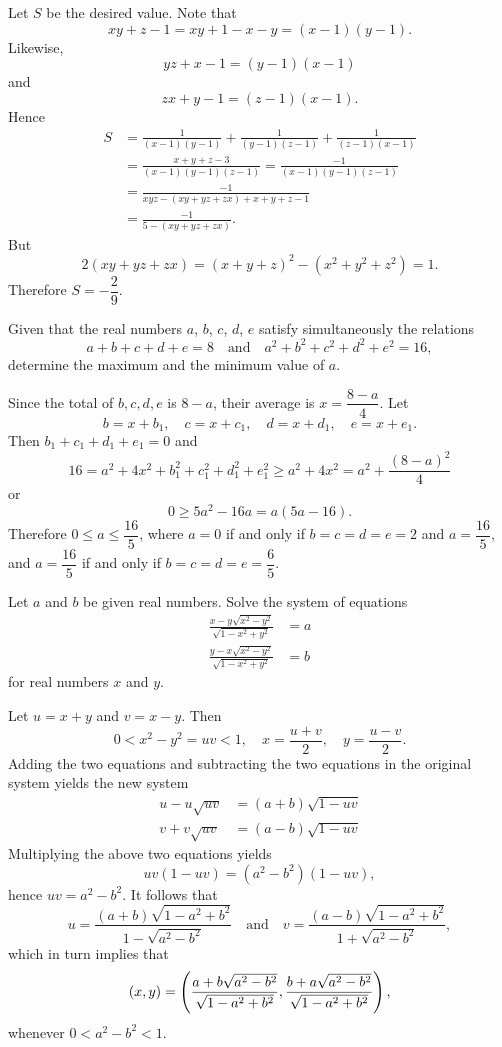 \begin{solution}
Let $S$ be the desired value. Note that
\[ xy+z-1=xy+1-x-y=(x-1)(y-1). \]
Likewise, 
\[ yz+x-1=(y-1)(x-1) \]
and
\[ zx+y-1=(z-1)(x-1). \]
Hence
\begin{align*}
S&=\frac{1}{(x-1)(y-1)}+\frac{1}{(y-1)(z-1)}+\frac{1}{(z-1)(x-1)}\\
&=\frac{x+y+z-3}{(x-1)(y-1)(z-1)}=\frac{-1}{(x-1)(y-1)(z-1)}\\
&=\frac{-1}{xyz-(xy+yz+zx)+x+y+z-1}\\
&=\frac{-1}{5-(xy+yz+zx)}.
\end{align*}
But
\[ 2(xy+yz+zx)=(x+y+z)^2-(x^2+y^2+z^2)=1. \]
Therefore $\boxed{S=-\dfrac{2}{9}}$.
\end{solution}
\pagebreak

\begin{prbm}
Given that the real numbers $a$, $b$, $c$, $d$, $e$ satisfy simultaneously the relations
\[ a+b+c+d+e=8 \quad \text{and} \quad a^2+b^2+c^2+d^2+e^2=16, \]
determine the maximum and the minimum value of $a$.
\end{prbm}

\begin{solution}
Since the total of $b,c,d,e$ is $8-a$, their average is $x=\dfrac{8-a}{4}$. Let
\[ b=x+b_1, \quad c=x+c_1, \quad d=x+d_1, \quad e=x+e_1. \]
Then $b_1+c_1+d_1+e_1=0$ and
\[ 16=a^2+4x^2+b_1^2+c_1^2+d_1^2+e_1^2\ge a^2+4x^2=a^2+\frac{(8-a)^2}{4} \]
or
\[ 0\ge5a^2-16a=a(5a-16). \]
Therefore $0\le a\le\dfrac{16}{5}$, where $a=0$ if and only if $b=c=d=e=2$ and $a=\dfrac{16}{5}$, and $a=\dfrac{16}{5}$ if and only if $b=c=d=e=\dfrac{6}{5}$.
\end{solution}
\pagebreak

\begin{prbm}
Let $a$ and $b$ be given real numbers. Solve the system of equations
\begin{align*}
\frac{x-y\sqrt{x^2-y^2}}{\sqrt{1-x^2+y^2}}&=a\\
\frac{y-x\sqrt{x^2-y^2}}{\sqrt{1-x^2+y^2}}&=b
\end{align*}
for real numbers $x$ and $y$.
\end{prbm}

\begin{solution}
Let $u=x+y$ and $v=x-y$. Then
\[ 0<x^2-y^2=uv<1, \quad x=\frac{u+v}{2}, \quad y=\frac{u-v}{2}. \]
Adding the two equations and subtracting the two equations in the original system yields the new system
\begin{align*}
u-u\sqrt{uv}&=(a+b)\sqrt{1-uv}\\
v+v\sqrt{uv}&=(a-b)\sqrt{1-uv}
\end{align*}
Multiplying the above two equations yields
\[ uv(1-uv)=(a^2-b^2)(1-uv), \]
hence $uv=a^2-b^2$. It follows that
\[ u=\frac{(a+b)\sqrt{1-a^2+b^2}}{1-\sqrt{a^2-b^2}} \quad \text{and} \quad v=\frac{(a-b)\sqrt{1-a^2+b^2}}{1+\sqrt{a^2-b^2}}, \]
which in turn implies that
\[ (x,y)=\left(\frac{a+b\sqrt{a^2-b^2}}{\sqrt{1-a^2+b^2}},\frac{b+a\sqrt{a^2-b^2}}{\sqrt{1-a^2+b^2}}\right), \]
whenever $0<a^2-b^2<1$.
\end{solution}
\pagebreak

